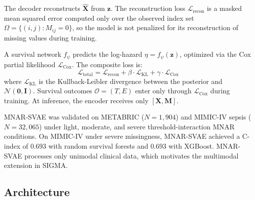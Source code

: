 \documentclass[final,3p,times,authoryear]{elsarticle}
\begin{document}
The decoder reconstructs $\hat{\mathbf{X}}$ from $\mathbf{z}$. The reconstruction loss $\mathcal{L}_{\text{recon}}$ is a masked mean squared error computed only over the observed index set $\Omega = \{(i,j) : M_{ij} = 0\}$, so the model is not penalized for its reconstruction of missing values during training.

A survival network $f_\psi$ predicts the log-hazard $\eta = f_\psi(\mathbf{z})$, optimized via the Cox partial likelihood \citep{cox1972regression} $\mathcal{L}_{\text{Cox}}$. The composite loss is:
\begin{equation}
\mathcal{L}_{\text{total}} = \mathcal{L}_{\text{recon}} + \beta \cdot \mathcal{L}_{\text{KL}} + \gamma \cdot \mathcal{L}_{\text{Cox}}
\end{equation}
where $\mathcal{L}_{\text{KL}}$ is the Kullback-Leibler divergence between the posterior and $\mathcal{N}(\mathbf{0}, \mathbf{I})$. Survival outcomes $\mathcal{O} = (T, E)$ enter only through $\mathcal{L}_{\text{Cox}}$ during training. At inference, the encoder receives only $[\mathbf{X}, \mathbf{M}]$.

MNAR-SVAE was validated on METABRIC ($N = 1{,}904$) and MIMIC-IV sepsis ($N = 32{,}065$) \citep{johnson2023mimic} under light, moderate, and severe threshold-interaction MNAR conditions. On MIMIC-IV under severe missingness, MNAR-SVAE achieved a C-index of $0.693$ with random survival forests \citep{ishwaran2008random} and $0.693$ with XGBoost. MNAR-SVAE processes only unimodal clinical data, which motivates the multimodal extension in SIGMA.

\subsection{Architecture}
\end{document}
